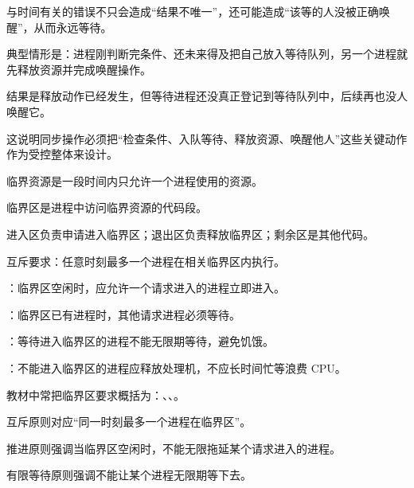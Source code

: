 \begin{points}
  \item 与时间有关的错误不只会造成“结果不唯一”，还可能造成“该等的人没被正确唤醒”，从而永远等待。
  \item 典型情形是：进程刚判断完条件、还未来得及把自己放入等待队列，另一个进程就先释放资源并完成唤醒操作。
  \item 结果是释放动作已经发生，但等待进程还没真正登记到等待队列中，后续再也没人唤醒它。
  \item 这说明同步操作必须把“检查条件、入队等待、释放资源、唤醒他人”这些关键动作作为受控整体来设计。
\end{points}


\begin{points}
  \item 临界资源是一段时间内只允许一个进程使用的资源。
  \item 临界区是进程中访问临界资源的代码段。
  \item 进入区负责申请进入临界区；退出区负责释放临界区；剩余区是其他代码。
  \item 互斥要求：任意时刻最多一个进程在相关临界区内执行。
\end{points}


\begin{points}
  \item {}：临界区空闲时，应允许一个请求进入的进程立即进入。
  \item {}：临界区已有进程时，其他请求进程必须等待。
  \item {}：等待进入临界区的进程不能无限期等待，避免饥饿。
  \item {}：不能进入临界区的进程应释放处理机，不应长时间忙等浪费 CPU。
\end{points}


\begin{points}
  \item 教材中常把临界区要求概括为：、、。
  \item 互斥原则对应“同一时刻最多一个进程在临界区”。
  \item 推进原则强调当临界区空闲时，不能无限拖延某个请求进入的进程。
  \item 有限等待原则强调不能让某个进程无限期等下去。
\end{points}

